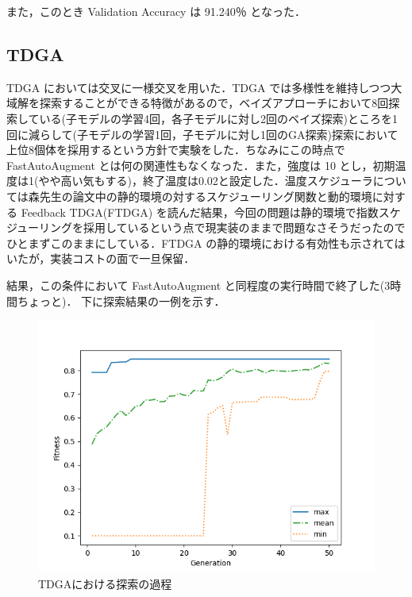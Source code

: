 \documentclass[onecolumn]{ujarticle}   %
\begin{document}
  また，このとき Validation Accuracy は 91.240％ となった．

  \subsection{TDGA}
  TDGA においては交叉に一様交叉を用いた．TDGA では多様性を維持しつつ大域解を探索することができる特徴があるので，ベイズアプローチにおいて8回探索している(子モデルの学習4回，各子モデルに対し2回のベイズ探索)ところを1回に減らして(子モデルの学習1回，子モデルに対し1回のGA探索)探索において上位8個体を採用するという方針で実験をした．ちなみにこの時点で FastAutoAugment とは何の関連性もなくなった．また，強度は 10 とし，初期温度は1(やや高い気もする)，終了温度は0.02と設定した．温度スケジューラについては森先生の論文中の静的環境の対するスケジューリング関数と動的環境に対する Feedback TDGA(FTDGA) を読んだ結果，今回の問題は静的環境で指数スケジューリングを採用しているという点で現実装のままで問題なさそうだったのでひとまずこのままにしている．FTDGA の静的環境における有効性も示されてはいたが，実装コストの面で一旦保留．

  結果，この条件において FastAutoAugment と同程度の実行時間で終了した(3時間ちょっと)．
  下に探索結果の一例を示す．

  \begin{figure}[h]
		\begin{center}
			\includegraphics[width=0.7\columnwidth]{stats_TDGA.png}
			\caption{TDGAにおける探索の過程}
			\label{fig:TDGA_stats}
		\end{center}
	\end{figure}
\end{document}
